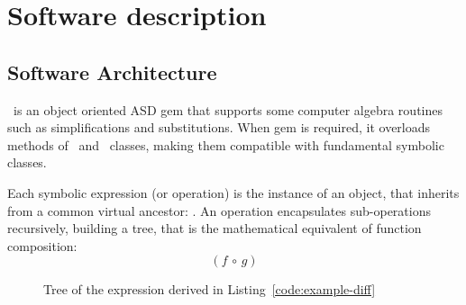 
\section{Software description}
\label{sec:description}


\subsection{Software Architecture}
\label{sec:architecture}


\ragnicas~is an object oriented ASD gem that supports some computer algebra routines such as simplifications and substitutions. When gem is required, it overloads methods of \Fixnum~and \Float~classes, making them compatible with fundamental symbolic classes.

Each symbolic expression (or operation) is the instance of an object, that inherits from a common virtual ancestor: \CASOp. An operation encapsulates sub-operations recursively, building a tree, that is the mathematical equivalent of function composition:
\begin{equation}
\left( f \, \circ \, g \right)
\end{equation}

\begin{figure}[ht!]
\centering

\caption{\label{fig:graph}Tree of the expression derived in Listing~\ref{code:example-diff}}
\end{figure}

